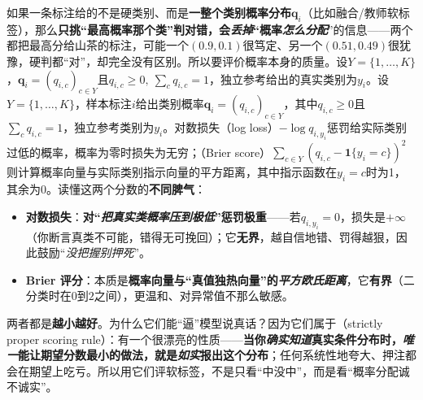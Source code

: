 如果一条标注给的不是硬类别、而是\textbf{一整个类别概率分布$\bm{q}_i$}（比如融合/教师软标签），那么\textbf{只挑“最高概率那个类”判对错，会\emph{丢掉}“概率\emph{怎么分配}}”的信息——两个都把最高分给山茶的标注，可能一个$(0.9,0.1)$很笃定、另一个$(0.51,0.49)$很犹豫，硬判都“对”，却完全没有区别。所以要评价概率本身的质量。设$Y=\{1,\ldots,K\}$，$\bm{q}_i=(q_{i,c})_{c\in Y}$且$q_{i,c}\geq0,\ \sum_cq_{i,c}=1$，独立参考给出的真实类别为$y_i$。设$Y=\{1,\ldots,K\}$，样本标注$i$给出类别概率$\bm{q}_i=(q_{i,c})_{c\in Y}$，其中$q_{i,c}\geq0$且$\sum_cq_{i,c}=1$，独立参考类别为$y_i$。对数损失（log loss）$-\log q_{i,y_i}$惩罚给实际类别过低的概率，概率为零时损失为无穷；（Brier score）$\sum_{c\in Y}(q_{i,c}-\mathbf{1}\{y_i=c\})^2$则计算概率向量与实际类别指示向量的平方距离，其中指示函数在$y_i=c$时为1，其余为0。读懂这两个分数的\textbf{不同脾气}：
\begin{itemize}\item \textbf{对数损失}：\textbf{对“\emph{把真实类概率压到极低}”惩罚极重}——若$q_{i,y_i}=0$，损失是$+\infty$（你断言真类不可能，错得无可挽回）；它\textbf{无界}，越自信地错、罚得越狠，因此鼓励“\emph{没把握别押死}”。\item \textbf{Brier 评分}：本质是\textbf{概率向量与“真值独热向量”的\emph{平方欧氏距离}}，它\textbf{有界}（二分类时在$0$到$2$之间），更温和、对异常值不那么敏感。\end{itemize}
两者都是\textbf{越小越好}。为什么它们能“逼”模型说真话？因为它们属于（strictly proper scoring rule）：有一个很漂亮的性质——\textbf{当你\emph{确实知道}真实条件分布时，\emph{唯一}能让期望分数最小的做法，就是\emph{如实}报出这个分布}；任何系统性地夸大、押注都会在期望上吃亏。所以用它们评软标签，不是只看“中没中”，而是看“概率分配诚不诚实”。

